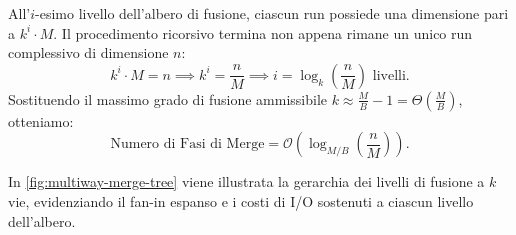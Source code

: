 All'$i$-esimo livello dell'albero di fusione, ciascun run possiede una dimensione pari a $k^i \cdot M$. Il procedimento ricorsivo termina non appena rimane un unico run complessivo di dimensione $n$:
\begin{equation}
  k^i \cdot M = n \implies k^i = \frac{n}{M} \implies i = \log_k\left(\frac{n}{M}\right) \text{ livelli}.
\end{equation}
Sostituendo il massimo grado di fusione ammissibile $k \approx \frac{M}{B} - 1 = \Theta\left(\frac{M}{B}\right)$, otteniamo:
\begin{equation}
  \text{Numero di Fasi di Merge} = \mathcal{O}\left(\log_{M/B}\left(\frac{n}{M}\right)\right).
\end{equation}

In \autoref{fig:multiway-merge-tree} viene illustrata la gerarchia dei livelli di fusione a $k$ vie, evidenziando il fan-in espanso e i costi di I/O sostenuti a ciascun livello dell'albero.

